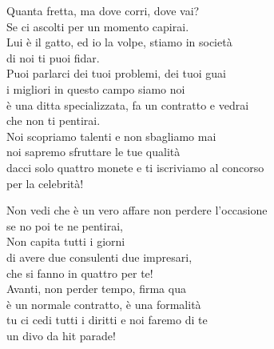 \documentclass[10pt, twoside, a4paper]{article}
\begin{document}
\begin{multicols}{2}

Quanta fretta, ma dove corri, dove vai? \\
Se ci ascolti per un momento capirai. \\
Lui \`e il gatto, ed io la volpe, stiamo in societ\`a \\
di noi ti puoi fidar. \hspace{32pt}\hspace{16pt} \\

Puoi parlarci dei tuoi problemi, dei tuoi guai \\
i migliori in questo campo siamo noi \\
\`e una ditta specializzata, fa un contratto e vedrai \\
che non ti pentirai. \\

Noi scopriamo talenti e non sbagliamo mai \\
noi sapremo sfruttare le tue qualità \\
dacci solo quattro monete e ti iscriviamo al concorso \\
per la celebrit\`a! \\

\columnbreak

Non vedi che \`e un vero affare non perdere l'occasione \\
se no poi te ne pentirai, \\
Non capita tutti i giorni \\
di avere due consulenti due impresari, \\
che si fanno in quattro per te! \\

Avanti, non perder tempo, firma qua \\
è un normale contratto, \`e una formalit\`a \\
tu ci cedi tutti i diritti e noi faremo di te \\
un divo da hit parade! \\


\end{multicols}
\end{document}
